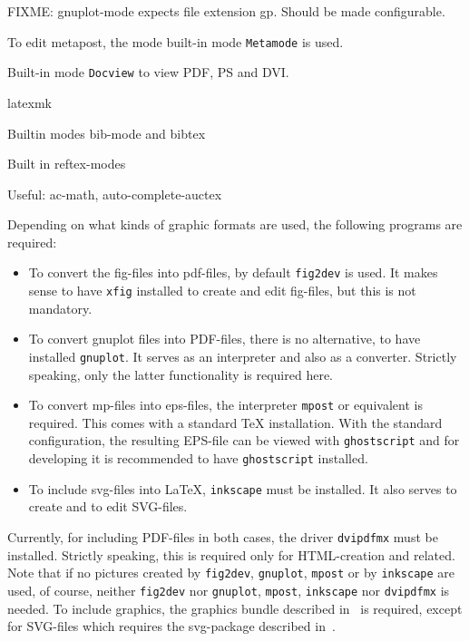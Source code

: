 FIXME\@: gnuplot-mode expects file extension gp. 
Should be made configurable. 

To edit metapost, the mode built-in mode \texttt{Metamode} is used. 

Built-in mode \texttt{Docview} to view PDF, PS and DVI\@. 

latexmk

Builtin modes bib-mode and bibtex

Built in reftex-modes

Useful: 
ac-math, auto-complete-auctex

Depending on what kinds of graphic formats are used, 
the following programs are required: 
%
\begin{itemize}
\item
To convert the \gls{fig}-files into \gls{pdf}-files, 
by default \texttt{fig2dev} is used. 
It makes sense to have \texttt{xfig} installed 
to create and edit fig-files, but this is not mandatory. 
\item
To convert gnuplot files into PDF-files, there is no alternative, 
to have installed \texttt{gnuplot}. 
It serves as an interpreter and also as a converter. 
Strictly speaking, only the latter functionality is required here. 
\item
To convert \gls{mp}-files into \gls{eps}-files, 
the interpreter \texttt{mpost} or equivalent is required. 
This comes with a standard \TeX{} installation. 
With the standard configuration, 
the resulting EPS-file can be viewed with \texttt{ghostscript} 
and for developing it is recommended to have \texttt{ghostscript} installed. 
\item
To include \gls{svg}-files into \LaTeX{}, 
\texttt{inkscape} must be installed. 
It also serves to create and to edit SVG-files. 
\end{itemize}


Currently, for including PDF-files in both cases, 
the driver \texttt{dvipdfmx} must be installed. 
Strictly speaking, this is required only for HTML-creation and related. 
Note that if no pictures created by \texttt{fig2dev}, \texttt{gnuplot}, 
\texttt{mpost} or by \texttt{inkscape} are used, of course, 
neither \texttt{fig2dev} nor \texttt{gnuplot},
\texttt{mpost}, \texttt{inkscape} 
nor \texttt{dvipdfmx} is needed. 
To include graphics, the graphics bundle described in~\cite{GraX} is required, 
except for SVG-files which requires the svg-package 
described in~\cite{SvgP}. 

